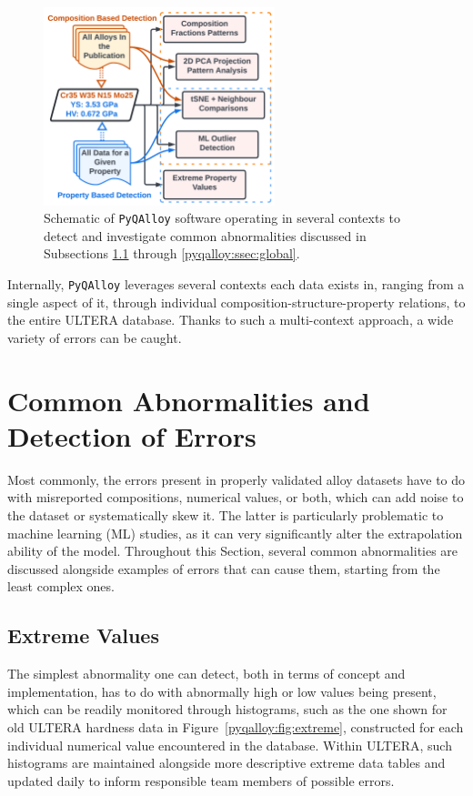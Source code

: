 \begin{figure}[H]
    \centering
    \includegraphics[width=0.6\textwidth]{pyqalloy/AbnormalCompositionDetection_v1.png}
    \caption{Schematic of \texttt{PyQAlloy} software operating in several contexts to detect and investigate common abnormalities discussed in Subsections \ref{pyqalloy:ssec:extreme} through \ref{pyqalloy:ssec:global}.}
    \label{pyqalloy:fig:schematic}
\end{figure}

Internally, \texttt{PyQAlloy} leverages several contexts each data exists in, ranging from a single aspect of it, through individual composition-structure-property relations, to the entire ULTERA database. Thanks to such a multi-context approach, a wide variety of errors can be caught.

\section{Common Abnormalities and Detection of Errors} \label{pyqalloy:sec:abnormalities}

Most commonly, the errors present in properly validated alloy datasets have to do with misreported compositions, numerical values, or both, which can add noise to the dataset or systematically skew it. The latter is particularly problematic to machine learning (ML) studies, as it can very significantly alter the extrapolation ability of the model. Throughout this Section, several common abnormalities are discussed alongside examples of errors that can cause them, starting from the least complex ones.

\subsection{Extreme Values} \label{pyqalloy:ssec:extreme}

The simplest abnormality one can detect, both in terms of concept and implementation, has to do with abnormally high or low values being present, which can be readily monitored through histograms, such as the one shown for old ULTERA hardness data in Figure~\ref{pyqalloy:fig:extreme}, constructed for each individual numerical value encountered in the database. Within ULTERA, such histograms are maintained alongside more descriptive extreme data tables and updated daily to inform responsible team members of possible errors.

